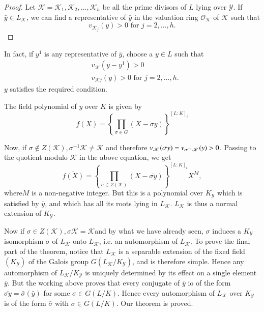 \begin{proof}
  Let $\mathscr{K} = \mathscr{K}_1, \mathscr{K}_2, \ldots ,\mathscr{K}_h$ be
  all the prime divisors of $L$ lying over $\mathscr{Y}$. If $\bar{y}
  \in  L_\mathscr{K}$, we can find a representative of $\bar{y}$ in
  the valuation ring $\mathscr{O}_\mathscr{K}$ of $\mathscr{K}$ such
  that  
  $$
  v_{\mathscr{K}_j} (y) > 0 \text{ for } j=2, \ldots , h.
  $$
\end{proof}

In  fact, if $y^1$ is any representative of $\bar{y}$, choose a $y \in
L$ such that  
\begin{align*}
  &v_\mathscr{K} (y-y^1) > 0 \\
  &v_{\mathscr{K} j}(y) > 0 \text{ for } j=2 ,\ldots,  h.
\end{align*}
$y$ satisfies the required condition.

The field polynomial of $y$ over $K$ is given by 
$$
f(X) = \left\{\prod_{\sigma \in G}  (X- \sigma y) \right\}^{[L : K]_i}
$$

Now, if $\sigma \notin Z(\mathscr{K}) , \sigma^{-1}\mathscr{K} \neq
\mathscr{K}$ and therefore $v_\mathscr{K}(\sigma y) = v_{\sigma^{-1}
  \mathscr{K}}\break (y) > 0$. Passing to the quotient modulo $\mathscr{K}$
in the above equation, we get  
$$
\overline{f(X)}=  \left \{  \prod_{\sigma \in  Z(\mathscr{K}) }(X-
\overline{\sigma y})\right \}^{[L:K]_i} X^M, 
$$
where\pageoriginale $M$ is a non-negative integer. But this is a polynomial over
$K_\mathscr{Y}$ which is satisfied  by  $\bar{y}$, and which has all
its roots lying in $L_\mathscr{K}$. $L_\mathscr{K}$ is thus a normal
extension of $K_\mathscr{Y}$. 

Now if  $\sigma \in Z(\mathscr{K}), \sigma \mathscr{K}=\mathscr{K}$and
by what we have already seen, $\sigma$ induces a $K_\mathscr{Y}$
isomorphism $\bar{\sigma}$ of $L_\mathscr{K}$ onto  $L_\mathscr{K}$,
i.e. an automorphism of $L_\mathscr{K}$. To prove the final part of
the theorem, notice that $L_\mathscr{K}$ is a separable extension of
the fixed field $(K_\mathscr{Y})$ of the Galois group
$G(L_\mathscr{K} / K_\mathscr{Y})$, and is therefore simple. Hence any
automorphism of $L_\mathscr{K} /  K_\mathscr{Y}$ is uniquely
determined  by its effect on a single element $\bar{y}$. But the
working  above proves that every conjugate of $\bar{y}$ io of the form
$\overline{\sigma y}= \bar{\sigma} (\bar{y})$ for some $\sigma \in
G(L/K)$. Hence every automorphism of $L_{\mathscr{K}}$ over
$K_{\mathscr{Y}}$ is of the form  $\bar{\sigma}$ with $\sigma \in
G(L/K)$. Our theorem is proved. 

